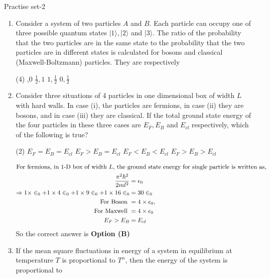 \begin{abox}
	Practise set-2
\end{abox}
\begin{enumerate}
		\item Consider a system of two particles $A$ and $B$. Each particle can occupy one of three possible quantum states $|1\rangle,|2\rangle$ and $|3\rangle$. The ratio of the probability that the two particles
	are in the same state to the probability that the two particles are in different states is calculated for bosons and classical (Maxwell-Boltzmann) particles. They are respectively
	{}
	\begin{tasks}(4)
		,0
		\task[\textbf{B.}]  $\frac{1}{2}, 1$
		\task[\textbf{C.}] $1, \frac{1}{2}$
		\task[\textbf{D.}] $0, \frac{1}{2}$
	\end{tasks}
	
\item Consider three situations of 4 particles in one dimensional box of width $L$ with hard walls. In case (i), the particles are fermions, in case (ii) they are bosons, and in case (iii) they are classical. If the total ground state energy of the four particles in these three cases are $E_{F}, E_{B}$ and $E_{c l}$ respectively, which of the following is true?
{}

\begin{tasks}(2)
\task[\textbf{A.}] $E_{F}=E_{B}=E_{c l}$
\task[\textbf{B.}] $E_{F}>E_{B}=E_{c l}$
\task[\textbf{C.}] $E_{F}<E_{B}<E_{c l}$
\task[\textbf{D.}] $E_{F}>E_{B}>E_{c l}$
\end{tasks}
\begin{answer}
\begin{align*}
\intertext{For fermions, in 1-D box of width $L$, the ground state energy for single particle is written as,}
\frac{\pi^{2} \hbar^{2}}{2 m l^{2}}&=\epsilon_{0}\\
\Rightarrow 1 \times \in_{0}+1 \times 4 \in_{0}+1 \times 9 \in_{0}+1 \times 16 \in_{0}&=30 \in_{0}\\
\text{ For Boson }&=4 \times \epsilon_{0},\\\text{ For Maxwell }&=4 \times \epsilon_{0}\\
E_{F}>E_{B}&=E_{c l}
\end{align*}
So the correct answer is \textbf{Option (B)}
\end{answer}
	\item If the mean square fluctuations in energy of a system in equilibrium at temperature $T$ is proportional to $T^{\alpha}$, then the energy of the system is proportional to
{}


\end{enumerate}
